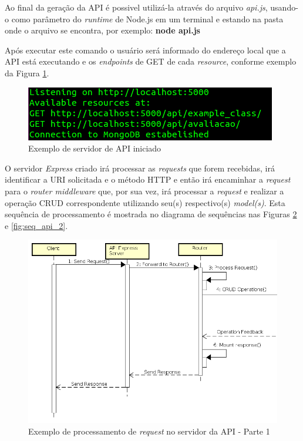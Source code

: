 Ao final da geração da API é possivel utilizá-la através do arquivo \textit{api.js}, usando-o como parâmetro do \textit{runtime} de Node.js em um terminal e estando na pasta onde o arquivo se encontra, por exemplo: \textbf{node api.js}

Após executar este comando o usuário será informado do endereço local que a API está executando e os \textit{endpoints} de GET de cada \textit{resource}, conforme exemplo da Figura \ref{fig:api_console}.

\begin{figure}
    \begin{center}
        \includegraphics[scale=0.7]{imagens/outApiConsole.png}
    \end{center}
	\caption{\label{fig:api_console}Exemplo de servidor de API iniciado}
\end{figure}

O servidor \textit{Express} criado irá processar as \textit{requests} que forem recebidas, irá identificar a URI solicitada e o método HTTP e então irá encaminhar a \textit{request} para o \textit{router middleware} que, por sua vez, irá processar a \textit{request} e realizar a operação CRUD correspondente utilizando seu(s) respectivo(s) \textit{model(s)}. Esta sequência de processamento é mostrada no diagrama de sequências nas Figuras \ref{fig:seq_api_1} e \ref{fig:seq_api_2}.


\begin{figure}
    \begin{center}
        \includegraphics[scale=0.7]{imagens/API_Sequence_Diagram_1.png}
    \end{center}
	\caption{\label{fig:seq_api_1}Exemplo de processamento de \textit{request} no servidor da API - Parte 1}
\end{figure}

